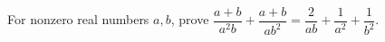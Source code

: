 For nonzero real numbers $a,b$, prove $\dfrac{a+b}{a^2b}+\dfrac{a+b}{ab^2}=\dfrac{2}{ab}+\dfrac{1}{a^2}+\dfrac{1}{b^2}$.
